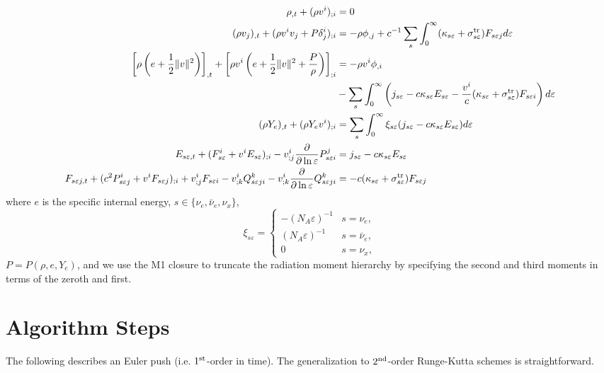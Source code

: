 \documentclass{article}
\begin{document}
\begin{align}
\rho_{,t} + (\rho v^i)_{;i}  &= 0 \\
(\rho v_j)_{,t} + (\rho v^i v_j + P \delta^i_j)_{;i} &= -\rho \phi_{,j} + c^{-1} \sum_s \int_0^\infty (\kappa_{s\varepsilon} + \sigma^{\rm tr}_{s\varepsilon}) F_{s\varepsilon j} d\varepsilon \\
\left[\rho \left(e + \frac{1}{2} \lVert v\rVert^2\right)\right]_{,t} + \left[\rho v^i \left(e + \frac{1}{2} \lVert v\rVert^2 + \frac{P}{\rho}\right)\right]_{;i} &= -\rho v^i \phi_{,i} \\ 
 & - \sum_s \int_0^\infty \left(j_{s\varepsilon} - c \kappa_{s\varepsilon} E_{s\varepsilon} - \frac{v^i}{c} (\kappa_{s\varepsilon} + \sigma^{\rm tr}_{s\varepsilon}) F_{s\varepsilon i}\right) d\varepsilon \\
(\rho Y_e)_{,t} + (\rho Y_e v^i)_{;i} &= \sum_s \int_0^\infty \xi_{s\varepsilon} (j_{s\varepsilon} - c \kappa_{s\varepsilon} E_{s\varepsilon}) d\varepsilon \\
E_{s\varepsilon,t} + (F_{s\varepsilon}^i + v^i E_{s\varepsilon})_{;i} - v^i_{;j}\frac{\partial}{\partial\ln\varepsilon} P_{s\varepsilon i}^j &= j_{s\varepsilon} - c \kappa_{s\varepsilon} E_{s\varepsilon} \\
F_{s\varepsilon j,t} + (c^2 P_{s\varepsilon j}^i + v^i F_{s\varepsilon j})_{;i} + v^i_{;j} F_{s\varepsilon i} - v^i_{;k} Q^k_{s\varepsilon ji} - v^i_{;k} \frac{\partial}{\partial\ln\varepsilon} Q^k_{s\varepsilon ji} &= -c(\kappa_{s\varepsilon} + \sigma^{\rm tr}_{s\varepsilon}) F_{s\varepsilon j}
\end{align}
where $e$ is the specific internal energy, $s\in\{\nu_e,\bar{\nu}_e,\nu_x\}$, 
\begin{equation}
\xi_{s\varepsilon} = \begin{cases}
	-(N_A \varepsilon)^{-1}&	\text{$s=\nu_e$},\\
	(N_A \varepsilon)^{-1}&		\text{$s=\bar{\nu}_e$},\\
	0&							\text{$s=\nu_x$},
	\end{cases}
\end{equation}
$P=P(\rho,e,Y_e)$, and we use the M1 closure to truncate the radiation moment hierarchy by specifying the second and third moments in terms of the zeroth and first.

\section{Algorithm Steps}
The following describes an Euler push (i.e. $1^{\rm st}$-order in time).  The generalization to $2^{\rm nd}$-order Runge-Kutta schemes is straightforward.
\end{document}
